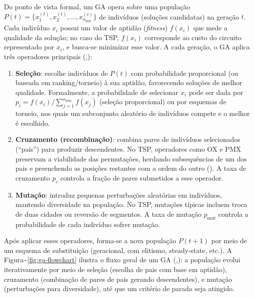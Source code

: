 Do ponto de vista formal, um GA opera sobre uma população
\(P(t) = \{x_1^{(t)}, x_2^{(t)}, \dots, x_{n_{pop}}^{(t)}\}\) de
indivíduos (soluções candidatas) na geração \(t\). Cada indivíduo
\(x_i\) possui um valor de aptidão (\emph{fitness}) \(f(x_i)\) que mede
a qualidade da solução; no caso do TSP, \(f(x_i)\) corresponde ao custo
do circuito representado por \(x_i\), e busca-se minimizar esse valor. A
cada geração, o GA aplica três operadores principais
(,):

\begin{enumerate}
\def\labelenumi{\arabic{enumi}.}
\item
  \textbf{Seleção}: escolhe indivíduos de \(P(t)\) com probabilidade
  proporcional (ou baseada em ranking/torneio) à sua aptidão,
  favorecendo soluções de melhor qualidade. Formalmente, a probabilidade
  de selecionar \(x_i\) pode ser dada por
  \(p_i = f(x_i) / \sum_{j=1}^{n_{pop}} f(x_j)\) (seleção proporcional)
  ou por esquemas de torneio, nos quais um subconjunto aleatório de
  indivíduos compete e o melhor é escolhido.
\item
  \textbf{Cruzamento (recombinação)}: combina pares de indivíduos
  selecionados (``pais'') para produzir descendentes. No TSP, operadores
  como OX e PMX preservam a viabilidade das permutações, herdando
  subsequências de um dos pais e preenchendo as posições restantes com a
  ordem do outro (). A taxa de
  cruzamento \(p_c\) controla a fração de pares submetidos a esse
  operador.
\item
  \textbf{Mutação}: introduz pequenas perturbações aleatórias em
  indivíduos, mantendo diversidade na população. No TSP, mutações
  típicas incluem troca de duas cidades ou reversão de segmentos. A taxa
  de mutação \(p_{\text{mut}}\) controla a probabilidade de cada
  indivíduo sofrer mutação.
\end{enumerate}

Após aplicar esses operadores, forma-se a nova população \(P(t+1)\) por
meio de um esquema de substituição (geracional, com elitismo,
steady-state, etc.). A Figura\textasciitilde{}\ref{fig:ga-flowchart}
ilustra o fluxo geral de um GA
(,):
a população evolui iterativamente por meio de seleção (escolha de pais
com base em aptidão), cruzamento (combinação de pares de pais gerando
descendentes), e mutação (perturbações para diversidade), até que um
critério de parada seja atingido.

